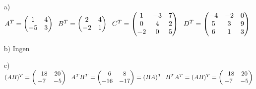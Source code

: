 \begin{enumerate}
    \item[a)]
        \begin{math}
            A^T=\begin{pmatrix}
                1 & 4\\
                -5 & 3
            \end{pmatrix}
            \hspace{6px}
            B^T=\begin{pmatrix}
                2 & 4\\
                -2 & 1
            \end{pmatrix}
            \hspace{6px}
            C^T=\begin{pmatrix}
                1 & -3 & 7\\
                0 & 4 & 2\\
                -2 & 0 & 5
            \end{pmatrix}
            \hspace{6px}
            D^T=\begin{pmatrix}
                -4 & -2 & 0\\
                5 & 3 & 9\\
                6 & 1 & 3
            \end{pmatrix}
        \end{math}
    \item[b)]
        Ingen
    \item[c)]
        \begin{math}
            (AB)^T=\begin{pmatrix}
                -18 & 20\\
                -7 & -5
            \end{pmatrix}
            \hspace{6px}
            A^TB^T=\begin{pmatrix}
                -6 & 8\\
                -16 & -17
            \end{pmatrix}
            =(BA)^T
            \hspace{6px}
            B^TA^T=(AB)^T=\begin{pmatrix}
                -18 & 20\\
                -7 & -5
            \end{pmatrix}
        \end{math}
\end{enumerate}